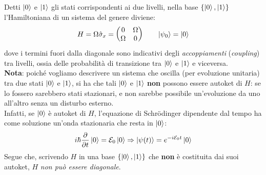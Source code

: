 \documentclass[../../InformazioneQuantistica.tex]{subfiles}
\begin{document}
Detti $\Ket{0}$ e $\Ket{1}$ gli stati corrispondenti ai due livelli, nella base $\{\Ket{0},\Ket{1}\}$ l'Hamiltoniana di un sistema del genere diviene:
\begin{align}
H = \Omega \hat{\sigma}_x = \begin{pmatrix}0 & \Omega\\\Omega & 0\end{pmatrix} \qquad \Ket{\psi_0}=\Ket{0}
\label{eqn:rabi-oscillation-H}
\end{align}
dove i termini fuori dalla diagonale sono indicativi degli \textit{accoppiamenti} (\textit{coupling}) tra livelli, ossia delle probabilità di transizione tra $\Ket{0}$ e $\Ket{1}$ e viceversa.\\

\textbf{Nota}: poiché vogliamo descrivere un sistema che oscilla (per evoluzione unitaria) tra due stati $\Ket{0}$ e $\Ket{1}$, si ha che tali $\Ket{0}$ e $\Ket{1}$ \textbf{non} possono essere autoket di $H$: se lo fossero sarebbero stati stazionari, e non sarebbe possibile un'evoluzione da uno all'altro senza un disturbo esterno.\\
Infatti, se $\Ket{0}$ è autoket di $H$, l'equazione di Schr\"odinger dipendente dal tempo ha come soluzione un'onda stazionaria che resta in $\Ket{0}$:
\begin{align*}
i\hbar \frac{\partial}{\partial t} \Ket{0} =\mathcal{E}_0 \Ket{0}\Rightarrow \Ket{\psi(t)}=e^{-i\mathcal{E}_0t}\Ket{0}
\end{align*}
Segue che, scrivendo $H$ in una base $\{\Ket{0},\Ket{1}\}$ che \textbf{non} è costituita dai suoi autoket, $H$ \textit{non può essere diagonale}.\\
\end{document}
